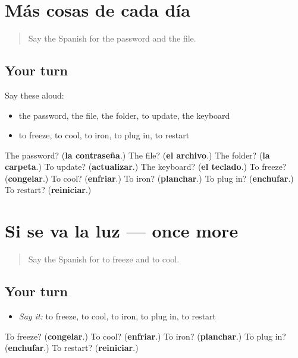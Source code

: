\section[(dialogue)]{Más cosas de cada día}

\label{lesson:ES-R777-repaso-776-777}



\begin{quote}
Say the Spanish for the password and the file.
\end{quote}

\subsection*{Your turn}
Say these aloud:

\begin{itemize}
\raggedright
  \item the password, the file, the folder, to update, the keyboard
  \item to freeze, to cool, to iron, to plug in, to restart
\end{itemize}

\begin{tcolorbox}[breakable,colback=teal!4,colframe=teal!35!black,title={Before you move on}]
The password? (\textbf{la contraseña}.) The file? (\textbf{el archivo}.) The folder? (\textbf{la carpeta}.) To update? (\textbf{actualizar}.) The keyboard? (\textbf{el teclado}.) To freeze? (\textbf{congelar}.) To cool? (\textbf{enfriar}.) To iron? (\textbf{planchar}.) To plug in? (\textbf{enchufar}.) To restart? (\textbf{reiniciar}.)
\end{tcolorbox}
\section[(dialogue)]{Si se va la luz — once more}

\label{lesson:ES-R777-repaso-final-777}



\begin{quote}
Say the Spanish for to freeze and to cool.
\end{quote}

\subsection*{Your turn}
\begin{itemize}
\raggedright
  \item \emph{Say it:} to freeze, to cool, to iron, to plug in, to restart
\end{itemize}

\begin{tcolorbox}[breakable,colback=teal!4,colframe=teal!35!black,title={Before you move on}]
To freeze? (\textbf{congelar}.) To cool? (\textbf{enfriar}.) To iron? (\textbf{planchar}.) To plug in? (\textbf{enchufar}.) To restart? (\textbf{reiniciar}.)
\end{tcolorbox}
